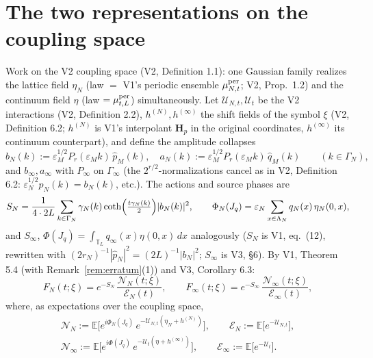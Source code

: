 \documentclass[11pt,a4paper]{article}
\theoremstyle{plain}
\theoremstyle{definition}
\newcommand{\T}{\mathbb{T}}
\newcommand{\E}{\mathbb{E}}
\newcommand{\eps}{\varepsilon}
\newcommand{\U}{\mathcal U}
\DeclareMathOperator{\cth}{coth}
\begin{document}
\section{The two representations on the coupling space}
\label{sec:representations}

Work on the V2 coupling space (V2, Definition 1.1): one Gaussian family
realizes the lattice field $\eta_N$ (law $=$ V1's periodic ensemble
$\mu^{\rm per}_{N,t}$; V2, Prop.\ 1.2) and the continuum field $\eta$
(law $=\mu^{\rm per}_{t,L}$) simultaneously. Let $\U_{N,t},\U_t$ be the
V2 interactions (V2, Definition 2.2), $h^{(N)},h^{(\infty)}$ the shift
fields of the symbol $\xi$ (V2, Definition 6.2; $h^{(N)}$ is V1's
interpolant $\bm H_p$ in the original coordinates, $h^{(\infty)}$ its
continuum counterpart), and define the amplitude collapses
\begin{equation}
 b_N(k):=\eps_M^{1/2}P_r(\eps_Mk)\,\widehat{p}_M(k),\quad
 a_N(k):=\eps_M^{1/2}P_r(\eps_Mk)\,\widehat{q}_M(k)\qquad(k\in\Gamma_N),
 \label{eq:amplitudes}
\end{equation}
and $b_\infty,a_\infty$ with $P_\infty$ on $\Gamma_\infty$ (the
$2^{r/2}$-normalizations cancel as in V2, Definition 6.2:
$\eps_N^{1/2}\widehat{p}_N(k)=b_N(k)$, etc.). The actions and source
phases are
\begin{equation}
 S_N=\frac1{4\cdot2L}\sum_{k\in\Gamma_N}
 \gamma_N(k)\cth\Bigl(\tfrac{t\gamma_N(k)}2\Bigr)|b_N(k)|^2,
 \qquad
 \Phi_N(J_q)=\eps_N\sum_{x\in\Lambda_N}q_N(x)\,\eta_N(0,x),
 \label{eq:SandPhi}
\end{equation}
and $S_\infty$, $\Phi(J_q)=\int_{\T_L}q_\infty(x)\eta(0,x)\,dx$
analogously ($S_N$ is V1, eq.\ (12), rewritten with
$(2r_N)^{-1}|\widehat p_N|^2=(2L)^{-1}|b_N|^2$; $S_\infty$ is V3, \S6).
By V1, Theorem 5.4 (with Remark~\ref{rem:erratum}(1)) and V3, Corollary
6.3:
\begin{equation}
 F_N(t;\xi)=e^{-S_N}\,\frac{\mathcal N_N(t;\xi)}{\mathcal E_N(t)},
 \qquad
 F_\infty(t;\xi)=e^{-S_\infty}\,
 \frac{\mathcal N_\infty(t;\xi)}{\mathcal E_\infty(t)},
 \label{eq:tworeps}
\end{equation}
where, as expectations over the coupling space,
\begin{gather*}
 \mathcal N_N:=\E\bigl[e^{i\Phi_N(J_q)}\,
 e^{-\U_{N,t}(\eta_N+h^{(N)})}\bigr],\qquad
 \mathcal E_N:=\E\bigl[e^{-\U_{N,t}}\bigr],\\
 \mathcal N_\infty:=\E\bigl[e^{i\Phi(J_q)}\,
 e^{-\U_{t}(\eta+h^{(\infty)})}\bigr],\qquad
 \mathcal E_\infty:=\E\bigl[e^{-\U_{t}}\bigr].
\end{gather*}
\end{document}
